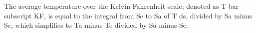 The average temperature over the Kelvin-Fahrenheit scale, denoted as T-bar subscript KF, is equal to the integral from Se to Sa of T ds, divided by Sa minus Se, which simplifies to Ta minus Te divided by Sa minus Se.